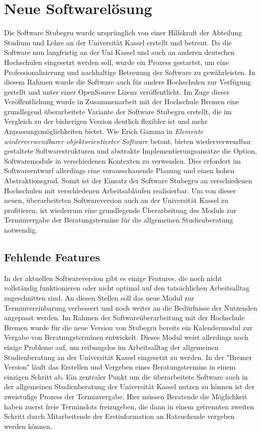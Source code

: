 \section{Neue Softwarelösung}
Die Software Stubegru wurde ursprünglich von einer Hilfskraft der Abteilung
Studium und Lehre an der Universität Kassel erstellt und betreut. Da die
Software nun langfristig an der Uni Kassel und auch an anderen deutschen
Hochschulen eingesetzt werden soll, wurde ein Prozess gestartet, um eine
Professionalisierung und nachhaltige Betreuung der Software zu gewährleisten.
In diesem Rahmen wurde die Software auch für andere Hochschulen zur Verfügung
gestellt und unter einer OpenSource Lizenz veröffentlicht. Im Zuge dieser
Veröffentlichung wurde in Zusammenarbeit mit der Hochschule Bremen eine
grundlegend überarbeitete Variante der Software Stubegru erstellt, die im
Vergleich zu der bisherigen Version deutlich flexibler ist und mehr
Anpassungsmöglichkeiten bietet. Wie Erich Gamma in \textit{Elemente
    wiederverwendbarer objektorientierter Software} betont, bieten wiederverwendbar
gestaltete Softwarestrukturen und abstrakte Implementierungsansätze die Option,
Softwaremodule in verschiedenen Kontexten zu verwenden. Dies erfordert im
Softwareentwurf allerdings eine vorausschauende Planung und einen hohen
Abstraktionsgrad.\cite{wiederverwSoftware} Somit ist der Einsatz der Software
Stubegru an verschiedenen Hochschulen mit verschiedenen Arbeitsabläufen
realisierbar. Um von dieser neuen, überarbeiteten Softwareversion auch an der
Universität Kassel zu profitieren, ist wiederrum eine grundlegende
Überarbeitung des Moduls zur Terminvergabe der Beratungstermine für die
allgemeinen Studienberatung notwendig.

\subsection{Fehlende Features}
In der aktuellen Softwareversion gibt es einige Features, die noch nicht
vollständig funktionieren oder nicht optimal auf den tatsächlichen
Arbeitsalltag zugeschnitten sind. An diesen Stellen soll das neue Modul zur
Terminvereinbarung verbessert und noch weiter an die Bedürfnisse der Nutzenden
angepasst werden. Im Rahmen der Softwareüberarbeitung mit der Hochschule Bremen
wurde für die neue Version von Stubegru bereits ein Kalendermodul zur Vergabe
von Beratungsterminen entwickelt. Dieses Modul weist allerdings noch einige
Probleme auf, um reibungslos im Arbeitsalltag der allgemeinen Studienberatung
an der Universität Kassel eingesetzt zu werden. In der "Bremer Version" läuft
das Erstellen und Vergeben eines Beratungstermins in einem einzigen Schritt ab.
Ein zentraler Punkt um die überarbeitete Software auch in der allgemeinen
Studienberatung der Universität Kassel nutzen zu können ist der zweistufige
Prozess der Terminvergabe. Hier müssen Beratende die Möglichkeit haben zuerst
freie Terminslots freizugeben, die dann in einem getrennten zweiten Schritt
durch Mitarbeitende der Erstinformation an Ratsuchende vergeben werden können.


